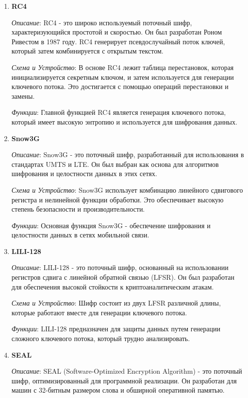 \documentclass[colorthm]{../civarticle}
\begin{document}
\begin{enumerate}
\item \textbf{RC4 ~\cite{RC4} }

\textit{Описание}: RC4 - это широко используемый поточный шифр, характеризующийся простотой и скоростью. Он был разработан Роном Ривестом в 1987 году. RC4 генерирует псевдослучайный поток ключей, который затем комбинируется с открытым текстом.

\textit{Схема и Устройство}: В основе RC4 лежит таблица перестановок, которая инициализируется секретным ключом, и затем используется для генерации ключевого потока. Это достигается с помощью операций перестановки и замены.

\textit{Функции}: Главной функцией RC4 является генерация ключевого потока, который имеет высокую энтропию и используется для шифрования данных.


\item \textbf{Snow3G ~\cite{snow} }

\textit{Описание}: Snow3G - это поточный шифр, разработанный для использования в стандартах UMTS и LTE. Он был выбран как основа для алгоритмов шифрования и целостности данных в этих сетях.

\textit{Схема и Устройство}: Snow3G использует комбинацию линейного сдвигового регистра и нелинейной функции обработки. Это обеспечивает высокую степень безопасности и производительности.

\textit{Функции}: Основная функция Snow3G - обеспечение шифрования и целостности данных в сетях мобильной связи.



\item \textbf{LILI-128 ~\cite{lili} }

\textit{Описание}: LILI-128 - это поточный шифр, основанный на использовании регистров сдвига с линейной обратной связью (LFSR). Он был разработан для обеспечения высокой стойкости к криптоаналитическим атакам.

\textit{Схема и Устройство}: Шифр состоит из двух LFSR различной длины, которые работают вместе для генерации ключевого потока.

\textit{Функции}: LILI-128 предназначен для защиты данных путем генерации сложного ключевого потока, который трудно анализировать.


\item \textbf{SEAL}

\textit{Описание}: SEAL (Software-Optimized Encryption Algorithm) - это поточный шифр, оптимизированный для программной реализации. Он разработан для машин с 32-битным размером слова и обширной оперативной памятью.


\end{enumerate}
\end{document}
